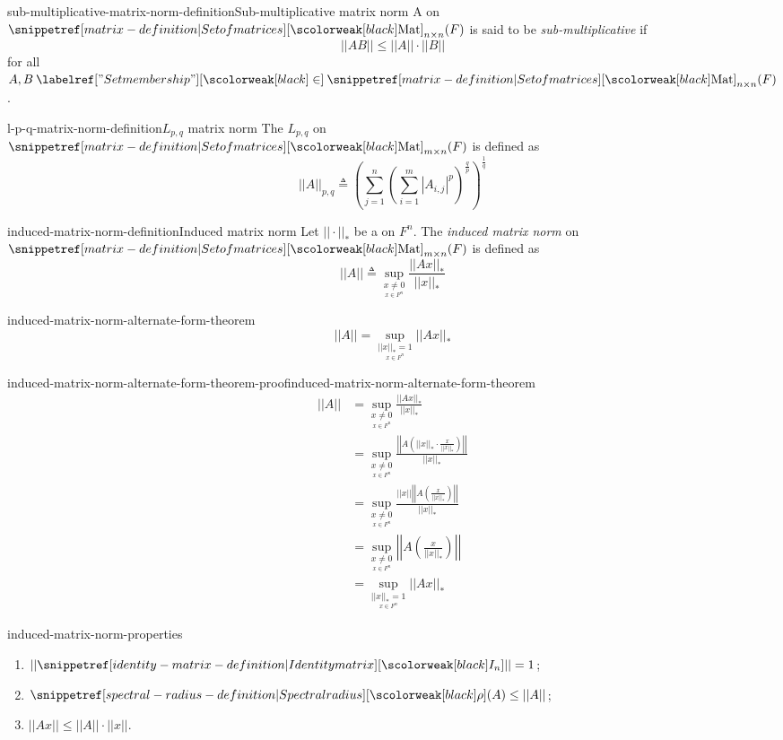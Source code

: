 \documentclass[preview]{standalone}
\begin{document}
\begin{snippetdefinition}{sub-multiplicative-matrix-norm-definition}{Sub-multiplicative matrix norm}
    A \mnorm on \(\matrices_{n\times n}(F)\) is said to be \emph{sub-multiplicative} if
    \[
        ||AB|| \leq ||A|| \cdot ||B||
    \]
    for all \(A,B\in \matrices_{n\times n}(F)\).
\end{snippetdefinition}

\begin{snippetdefinition}{l-p-q-matrix-norm-definition}{\(L_{p,q}\) matrix norm}
    The \mnorm \(L_{p,q}\) on \(\matrices_{m\times n}(F)\) is defined as
    \[
        ||A||_{p,q} \triangleq {\left(
            \sum_{j=1}^n {\left(
                \sum_{i=1}^m |A_{i,j}|^p
            \right)}^{\frac{q}{p}}
        \right)}^{\frac{1}{q}}
    \]
\end{snippetdefinition}

\begin{snippetdefinition}{induced-matrix-norm-definition}{Induced matrix norm}
    Let \(||\cdot||_*\) be a \norm on \(F^n\). The \emph{induced matrix norm}
    on \(\matrices_{m\times n}(F)\) is defined as
    \[
        ||A|| \triangleq \sup_{\underset{x\in F^n}{x \neq 0}} \frac{||Ax||_*}{||x||_*}
    \]
\end{snippetdefinition}

\begin{snippettheorem}{induced-matrix-norm-alternate-form-theorem}{}
    \[
        ||A|| = \sup_{\underset{x\in F^n}{||x||_* = 1}} ||Ax||_*
    \]
\end{snippettheorem}

\begin{snippetproof}{induced-matrix-norm-alternate-form-theorem-proof}{induced-matrix-norm-alternate-form-theorem}{}
    \begin{align*}
        ||A|| &= \sup_{\underset{x\in F^n}{x \neq 0}} \frac{||Ax||_*}{||x||_*} \\
        &= \sup_{\underset{x\in F^n}{x \neq 0}} \frac{\left|\left|A \left(||x||_* \cdot \frac{x}{||x||_*}\right)\right|\right|}{||x||_*} \\
        &= \sup_{\underset{x\in F^n}{x \neq 0}} \frac{||x|| \left|\left| A \left(\frac{x}{||x||_*}\right)\right|\right|}{||x||_*} \\
        &= \sup_{\underset{x\in F^n}{x \neq 0}} \left|\left|A \left(\frac{x}{||x||_*}\right)\right|\right| \\
        &= \sup_{\underset{x\in F^n}{||x||_* = 1}} ||Ax||_*
    \end{align*}
\end{snippetproof}

\begin{snippetproposition}{induced-matrix-norm-properties}{}
    \begin{enumerate}
        \item \(||\identmatrix{n}|| = 1\);
        \item \(\spectralradius(A) \leq ||A||\);
        \item \(||Ax|| \leq ||A|| \cdot ||x||\).
    \end{enumerate}
\end{snippetproposition}
\end{document}
